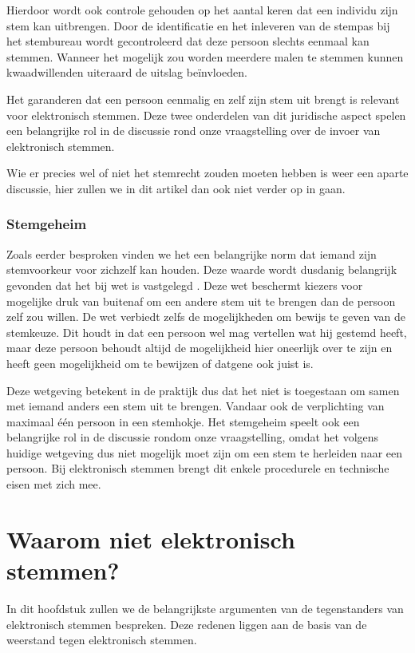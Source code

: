 \documentclass[a4paper]{article}
\begin{document}
Hierdoor wordt ook controle gehouden op het aantal keren dat een individu zijn stem kan uitbrengen.
Door de identificatie en het inleveren van de stempas bij het stembureau wordt gecontroleerd dat deze persoon slechts eenmaal kan stemmen.
Wanneer het mogelijk zou worden meerdere malen te stemmen kunnen kwaadwillenden uiteraard de uitslag beïnvloeden.

Het garanderen dat een persoon eenmalig en zelf zijn stem uit brengt is relevant voor elektronisch stemmen. 
Deze twee onderdelen van dit juridische aspect spelen een belangrijke rol in de discussie rond onze vraagstelling over de invoer van elektronisch stemmen.

Wie er precies wel of niet het stemrecht zouden moeten hebben is weer een aparte discussie, hier zullen we in dit artikel dan ook niet verder op in gaan.

\subsubsection{Stemgeheim}
Zoals eerder besproken vinden we het een belangrijke norm dat iemand zijn stemvoorkeur voor zichzelf kan houden.
Deze waarde wordt dusdanig belangrijk gevonden dat het bij wet is vastgelegd \cite{wetboek}.
Deze wet beschermt kiezers voor mogelijke druk van buitenaf om een andere stem uit te brengen dan de persoon zelf zou willen.
De wet verbiedt zelfs de mogelijkheden om bewijs te geven van de stemkeuze.
Dit houdt in dat een persoon wel mag vertellen wat hij gestemd heeft, maar deze persoon behoudt altijd de mogelijkheid hier oneerlijk over te zijn en heeft geen mogelijkheid om te bewijzen of datgene ook juist is.

Deze wetgeving betekent in de praktijk dus dat het niet is toegestaan om samen met iemand anders een stem uit te brengen.
Vandaar ook de verplichting van maximaal {\'e}{\'e}n persoon in een stemhokje.
Het stemgeheim speelt ook een belangrijke rol in de discussie rondom onze vraagstelling, omdat het volgens huidige wetgeving dus niet mogelijk moet zijn om een stem te herleiden naar een persoon.
Bij elektronisch stemmen brengt dit enkele procedurele en technische eisen met zich mee.

\newpage

\section{Waarom niet elektronisch stemmen?}
\label{text:tegen}
In dit hoofdstuk zullen we de belangrijkste argumenten van de tegenstanders van elektronisch stemmen bespreken.
Deze redenen liggen aan de basis van de weerstand tegen elektronisch stemmen.
\end{document}
